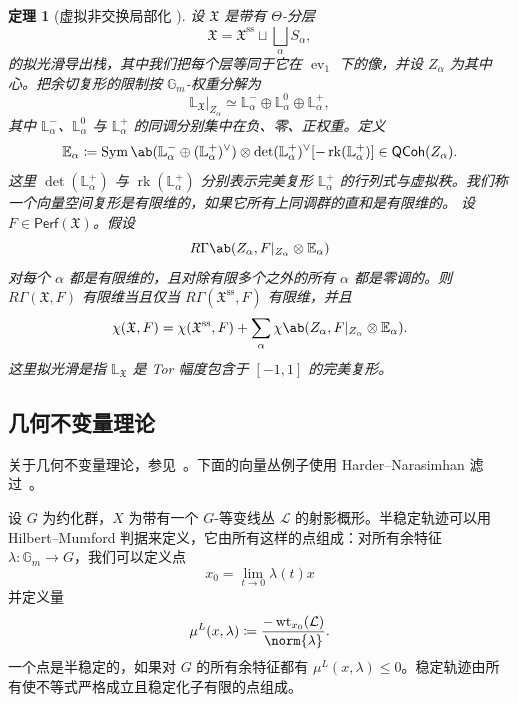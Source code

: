 \documentclass{amsart}
\newtheorem{thm}{定理}[section]
\theoremstyle{definition}
\theoremstyle{remark}
\theoremstyle{plain}
\theoremstyle{definition}
\theoremstyle{remark}
\newcommand{\G}{\mathbb{G}}
\newcommand{\E}{\mathbb{E}}
\renewcommand{\L}{\mathbb{L}}
\newcommand{\mc}[1]{\mathcal{#1}}
\newcommand{\mf}[1]{\mathfrak{#1}}
\newcommand{\mr}[1]{\mathrm{#1}}
\newcommand{\on}[1]{\operatorname{#1}}
\newcommand{\ms}[1]{\mathsf{#1}}
\newcommand{\1}{\mathbf{1}}
\newcommand{\2}{\mathbf{2}}
\newcommand{\3}{\mathbf{3}}
\DeclareMathOperator{\ev}{ev}
\begin{document}
\begin{thm}[虚拟非交换局部化 {\cite[定理~5.1]{HLlocalization}}]
    设 \(\mf{X}\) 是带有 \(\Theta\)-分层
    \[
        \mf{X}
        =
        \mf{X}^{\mr{ss}}
        \sqcup
        \bigsqcup_\alpha S_\alpha,
    \]
    的拟光滑导出栈，其中我们把每个层等同于它在 \(\ev_1\) 下的像，并设 \(Z_\alpha\) 为其中心。把余切复形的限制按 \(\G_m\)-权重分解为
    \[
        \L_{\mf{X}}|_{Z_\alpha}
        \simeq
        \L_\alpha^-
        \oplus
        \L_\alpha^0
        \oplus
        \L_\alpha^+,
    \]
    其中 \(\L_\alpha^-\)、\(\L_\alpha^0\) 与 \(\L_\alpha^+\) 的同调分别集中在负、零、正权重。定义
    \[
        \E_\alpha
        \coloneqq
        \on{Sym}\ab(
            \L_\alpha^-
            \oplus
            (\L_\alpha^+)^\vee
        )
        \otimes
        \det(\L_\alpha^+)^\vee
        [-\on{rk}(\L_\alpha^+)]
        \in
        \ms{QCoh}(Z_\alpha).
    \]
    这里 \(\det(\L_\alpha^+)\) 与 \(\on{rk}(\L_\alpha^+)\) 分别表示完美复形 \(\L_\alpha^+\) 的行列式与虚拟秩。我们称一个向量空间复形是有限维的，如果它所有上同调群的直和是有限维的。
    设 \(F\in\ms{Perf}(\mf{X})\)。假设
    \[
        R\Gamma\ab(
            Z_\alpha,
            F|_{Z_\alpha}\otimes\E_\alpha
        )
    \]
    对每个 \(\alpha\) 都是有限维的，且对除有限多个之外的所有 \(\alpha\) 都是零调的。则 \(R\Gamma(\mf{X},F)\) 有限维当且仅当 \(R\Gamma(\mf{X}^{\mr{ss}},F)\) 有限维，并且
    \[
        \chi(\mf{X},F)
        =
        \chi(\mf{X}^{\mr{ss}},F)
        +
        \sum_\alpha
        \chi\ab(
            Z_\alpha,
            F|_{Z_\alpha}\otimes\E_\alpha
        ).
    \]
    这里拟光滑是指 \(\L_{\mf{X}}\) 是 Tor 幅度包含于 \([-1,1]\) 的完美复形。
\end{thm}


\subsection{几何不变量理论}%
\label{sub:Geometric invariant theory}

关于几何不变量理论，参见~\cite{MFK1994}。下面的向量丛例子使用 Harder--Narasimhan 滤过~\cite{HN1975}。

设 \(G\) 为约化群，\(X\) 为带有一个 \(G\)-等变线丛 \(\mc{L}\) 的射影概形。半稳定轨迹可以用 Hilbert--Mumford 判据来定义，它由所有这样的点组成：对所有余特征
\(\lambda \colon \G_m \to G\)，我们可以定义点 
\[ x_0 = \lim_{t \to 0} \lambda(t) x \]
并定义量
\[ \mu^L(x, \lambda) \coloneqq \frac{-\on{wt}_{x_0}(\mc{L})}{\norm{\lambda}}. \]
一个点是半稳定的，如果对 \(G\) 的所有余特征都有 \(\mu^L(x, \lambda) \leq 0\)。稳定轨迹由所有使不等式严格成立且稳定化子有限的点组成。
\end{document}
